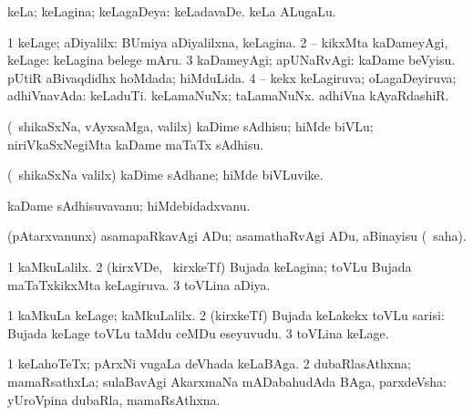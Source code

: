 \bentry
{} 
\gl{\gu}
\expl{}
\bmng
 keLa; keLagina; keLagaDeya:  keLadavaDe.  keLa ALugaLu. 
\emng
\eentry

\bentry
{} 
\gl{\pUparx}
\expl{}
\bmng
\bnum
\num{1} keLage; aDiyalilx:  BUmiya aDiyalilxna, keLagina. 
\num{2} -- kikxMta kaDameyAgi, keLage:  keLagina belege mAru. 
\num{3} kaDameyAgi; apUNaRvAgi:  kaDame beVyisu.  pUtiR aBivaqdidhx hoMdada; hiMduLida. 
\num{4} -- kekx keLagiruva; oLagaDeyiruva; adhiVnavAda:  keLaduTi.  keLamaNuNx; taLamaNuNx.  adhiVna kAyaRdashiR. 
\enum
\emng
\eentry

\bentry
{} 
\gl{\akirx}
\expl{}
\bmng
 (\kanmu\ shikaSxNa, vAyxsaMga, \mo valilx) kaDime sAdhisu; hiMde biVLu; niriVkaSxNegiMta kaDame maTaTx sAdhisu. 
\emng
\eentry

\bentry
{} 
\gl{\nA}
\expl{}
\bmng
 (\kanmu\ shikaSxNa \mo valilx) kaDime sAdhane; hiMde biVLuvike. 
\emng
\eentry

\bentry
{} 
\gl{\nA}
\expl{}
\bmng
 kaDame sAdhisuvavanu; hiMdebidadxvanu. 
\emng
\eentry

\bentry
{} 
\gl{\sakirx}
\expl{}
\bmng
 (pAtarxvanunx) asamapaRkavAgi ADu; asamathaRvAgi ADu, aBinayisu (\akirx\ saha). 
\emng
\eentry

\bentry
{} 
\gl{\gu}
\expl{}
\bmng
\bnum
\num{1} kaMkuLalilx. 
\hypertarget{underarm(1)2}{} 
\num{2} (kirxVDe, \kanmu\ kirxkeTf) Bujada keLagina; toVLu Bujada maTaTxkikxMta keLagiruva. 
\num{3} toVLina aDiya. 
\enum
\emng
\eentry

\bentry
{} 
\gl{\kirxvi}
\expl{}
\bmng
\bnum
\num{1} kaMkuLa keLage; kaMkuLalilx. 
\num{2} (kirxkeTf) Bujada keLakekx toVLu sarisi:  Bujada keLage toVLu taMdu ceMDu eseyuvudu. 
\num{3} toVLina keLage. 
\enum
\emng
\eentry

\bentry
{} 
\gl{\nA}
\bmng
\bnum
\num{1} keLahoTeTx; pArxNi \mo vugaLa deVhada keLaBAga. 
\num{2} dubaRlasAthxna; mamaRsathxLa; sulaBavAgi AkarxmaNa mADabahudAda BAga, parxdeVsha:  yUroVpina dubaRla, mamaRsAthxna. 
\enum
\emng
\eentry

